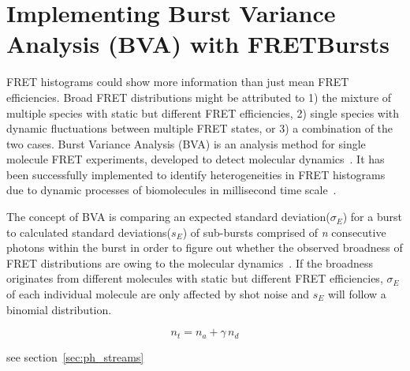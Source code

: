\section{Implementing Burst Variance Analysis (BVA) with FRETBursts}

FRET histograms could show more information than just mean FRET efficiencies. Broad FRET distributions might be attributed to 1) the mixture of multiple species with static but different FRET efficiencies, 2) single species with dynamic fluctuations between multiple FRET states, or 3) a combination of the two cases. Burst Variance Analysis (BVA) is an analysis method for single molecule FRET experiments, developed to detect molecular dynamics~\cite{Torella_2011}. It has been successfully implemented to identify heterogeneities in FRET histograms due to dynamic processes of biomolecules in millisecond time scale~\cite{Torella_2011, Robb_2013}.

The concept of BVA is comparing an expected standard deviation($\sigma_E$) for a burst to calculated standard deviations($s_E$) of sub-bursts comprised of \textit{n} consecutive photons within the burst in order to figure out whether the observed broadness of FRET distributions are owing to the molecular dynamics~\cite{Torella_2011}. If the broadness originates from different molecules with static but different FRET efficiencies, $\sigma_E$ of each individual molecule are only affected by shot noise and $s_E$ will follow a binomial distribution.  

$$ n_t = n_a + \gamma\,n_d$$ 

see section~\ref{sec:ph_streams}